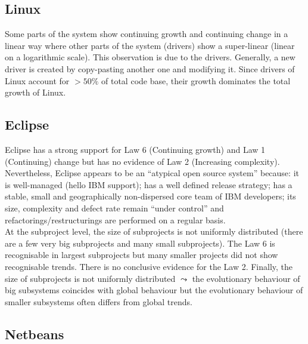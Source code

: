 \documentclass[a4paper,11pt]{report}
\begin{document}
\subsection{Linux}
Some parts of the system show continuing growth and continuing change in a
linear way where other parts of the system (drivers) show a super-linear
(linear on a logarithmic scale). This observation is due to the drivers.
Generally, a new driver is created by copy-pasting another one and modifying it.
Since drivers of Linux account for \underline{$>50\%$} of total code base,
their growth dominates the total growth of Linux.

\subsection{Eclipse}
Eclipse has a strong support for Law 6 (Continuing growth) and Law 1
(Continuing) change but has no evidence of Law 2 (Increasing complexity).
Nevertheless, Eclipse appears to be an ``atypical open source system'' because:
it is well-managed (hello IBM support); has a well defined release strategy;
has a stable, small and geographically non-dispersed core team of IBM
developers; its size, complexity and defect rate remain ``under control'' and
refactorings/restructurings are performed on a regular basis.\\

At the subproject level, the size of subprojects is not uniformly distributed
(there are a few very big subprojects and many small subprojects). The Law 6
is recognisable in largest subprojects but many smaller projects did not show
recognisable trends. There is no conclusive evidence for the Law 2. Finally,
the size of subprojects is not uniformly distributed $\leadsto$ the evolutionary
behaviour of big subsystems coincides with global behaviour but the evolutionary
behaviour of smaller subsystems often differs from global trends.

\subsection{Netbeans}
\end{document}
